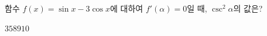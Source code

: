 함수 $f(x)=\sin x-3\cos x$에 대하여 $f'(\alpha)=0$일 때, $\csc^2\alpha$의 값은?
\begin{choices32}{$3$}{$5$}{$8$}{$9$}{$10$}\end{choices32}
